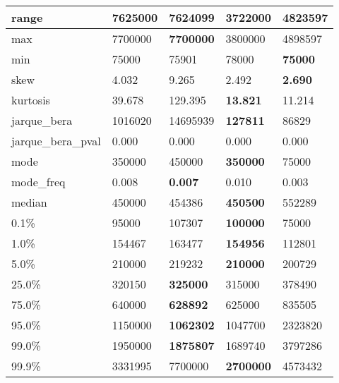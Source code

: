 \begin{table}[H]
\begin{tabular}{|l|m{10em}|m{10em}|m{10em}|m{10em}|}
\hline range & 7625000 & \bfseries 7624099 & \cellcolor[rgb]{0.9, 0.54, 0.52} 3722000 & 4823597 \\
\hline max & 7700000 & \bfseries 7700000 & \cellcolor[rgb]{0.9, 0.54, 0.52} 3800000 & 4898597 \\
\hline min & 75000 & 75901 & \cellcolor[rgb]{0.9, 0.54, 0.52} 78000 & \bfseries 75000 \\
\hline skew & 4.032 & \cellcolor[rgb]{0.9, 0.54, 0.52} 9.265 & 2.492 & \bfseries 2.690 \\
\hline kurtosis & 39.678 & \cellcolor[rgb]{0.9, 0.54, 0.52} 129.395 & \bfseries 13.821 & 11.214 \\
\hline jarque\_bera & 1016020 & \cellcolor[rgb]{0.9, 0.54, 0.52} 14695939 & \bfseries 127811 & 86829 \\
\hline jarque\_bera\_pval & 0.000 & 0.000 & 0.000 & 0.000 \\
\hline mode & 350000 & 450000 & \bfseries 350000 & \cellcolor[rgb]{0.9, 0.54, 0.52} 75000 \\
\hline mode\_freq & 0.008 & \bfseries 0.007 & 0.010 & \cellcolor[rgb]{0.9, 0.54, 0.52} 0.003 \\
\hline median & 450000 & 454386 & \bfseries 450500 & \cellcolor[rgb]{0.9, 0.54, 0.52} 552289 \\
\hline 0.1\% & 95000 & 107307 & \bfseries 100000 & \cellcolor[rgb]{0.9, 0.54, 0.52} 75000 \\
\hline 1.0\% & 154467 & 163477 & \bfseries 154956 & \cellcolor[rgb]{0.9, 0.54, 0.52} 112801 \\
\hline 5.0\% & 210000 & 219232 & \bfseries 210000 & \cellcolor[rgb]{0.9, 0.54, 0.52} 200729 \\
\hline 25.0\% & 320150 & \bfseries 325000 & 315000 & \cellcolor[rgb]{0.9, 0.54, 0.52} 378490 \\
\hline 75.0\% & 640000 & \bfseries 628892 & 625000 & \cellcolor[rgb]{0.9, 0.54, 0.52} 835505 \\
\hline 95.0\% & 1150000 & \bfseries 1062302 & 1047700 & \cellcolor[rgb]{0.9, 0.54, 0.52} 2323820 \\
\hline 99.0\% & 1950000 & \bfseries 1875807 & 1689740 & \cellcolor[rgb]{0.9, 0.54, 0.52} 3797286 \\
\hline 99.9\% & 3331995 & \cellcolor[rgb]{0.9, 0.54, 0.52} 7700000 & \bfseries 2700000 & 4573432 \\
\hline
\end{tabular}
\end{table}
